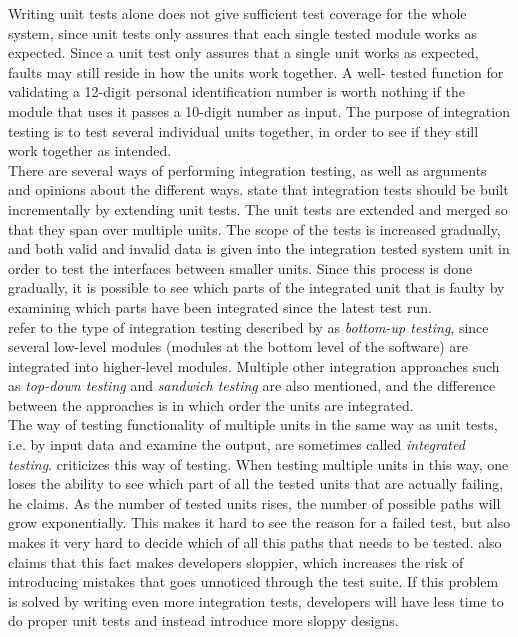 Writing unit tests alone does not give sufficient test coverage for the
whole system, since unit tests only assures that each single tested
module works as expected. Since a unit test only assures that a single
unit works as expected, faults may still reside in how the units work
together. A well- tested function for validating a 12-digit personal
identification number is worth nothing if the module that uses it passes
a 10-digit number as input. The purpose of integration testing is to
test several individual units together, in order to see if they still
work together as intended.\\

There are several ways of performing integration testing, as well as
arguments and opinions about the different ways. \citet{book:adp} state
that integration tests should be built incrementally by extending unit
tests. The unit tests are extended and merged so that they span over
multiple units. The scope of the tests is increased gradually, and both
valid and invalid data is given into the integration tested system unit
in order to test the interfaces between smaller units. Since this
process is done gradually, it is possible to see which parts of the
integrated unit that is faulty by examining which parts have been
integrated since the latest test run.\\

\citet{book:pfleeger} refer to the type of integration testing described
by \citeauthor{book:adp} as \emph{bottom-up testing}, since several
low-level modules (modules at the bottom level of the software) are
integrated into higher-level modules. Multiple other integration
approaches such as \emph{top-down testing} and \emph{sandwich testing}
are also mentioned, and the difference between the approaches is in which
order the units are integrated.\\

The way of testing functionality of multiple units in the same way as
unit tests, i.e. by input data and examine the output, are sometimes
called \emph{integrated testing}. \citet{video:integrated_scam}
criticizes this way of testing. When testing multiple units in this way,
one loses the ability to see which part of all the tested units that are
actually failing, he claims. As the number of tested units rises, the
number of possible paths will grow exponentially. This makes it hard to
see the reason for a failed test, but also makes it very hard to decide
which of all this paths that needs to be tested.
\citeauthor{video:integrated_scam} also claims that this fact makes
developers sloppier, which increases the risk of introducing mistakes
that goes unnoticed through the test suite. If this problem is solved by
writing even more integration tests, developers will have less time to
do proper unit tests and instead introduce more sloppy designs.\\

